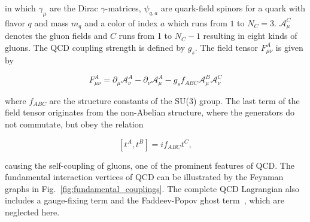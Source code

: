 in which $\gamma_\mu$ are the Dirac $\gamma$-matrices, $\psi_{q,a}$ are
quark-field spinors for a quark with flavor $q$ and mass $m_q$ and a color of
index $a$ which runs from $1$ to $N_C=3$. $\mathcal{A}_\mu^C$ denotes the gluon
fields and $C$ runs from 1 to $N_C-1$ resulting in eight kinds of gluons. The
QCD coupling strength is defined by $g_s$. The field tensor $F_{\mu\nu}^A$ is
given by

\begin{equation*}
    F_{\mu\nu}^A = \partial_\mu \mathcal{A}_\nu^A - \partial_{\nu}
    \mathcal{A}_{\mu}^A - g_s f_{ABC} \mathcal{A}_{\mu}^B
    \mathcal{A}_{\nu}^C
\end{equation*}

where $f_{ABC}$ are the structure constants of the SU(3) group. The last term of
the field tensor originates from the non-Abelian structure,  where the generators
do not commutate, but obey the relation

\begin{equation*}
    \left[t^A, t^B \right] = if_{ABC} t^{C},
\end{equation*}

causing the self-coupling of gluons, one of the prominent features of QCD. The
fundamental interaction vertices of QCD can be illustrated by the Feynman graphs
in Fig.~\ref{fig:fundamental_couplings}. The complete QCD Lagrangian also
includes a gauge-fixing term and the Faddeev-Popov ghost
term~\cite{Faddeev:1967fc}, which are neglected here.

